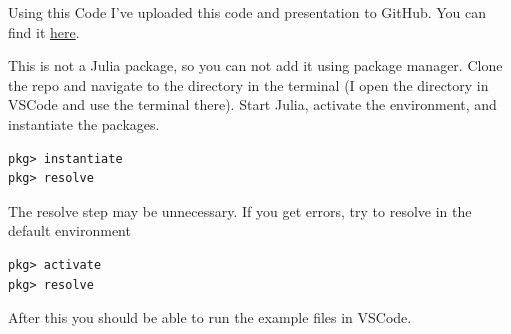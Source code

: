 \documentclass{beamer}
\begin{document}
\begin{frame}[fragile]{Using this Code}
    I've uploaded this code and presentation to GitHub. You can find it \href{https://github.com/mitchphillipson/2025-04-22-USDA_MPSGE}{here}. 

    \vspace{3mm}

    This is not a Julia package, so you can not add it using package manager. Clone the repo and navigate to the directory in the terminal (I open the directory in VSCode and use the terminal there). Start Julia, activate the environment, and instantiate the packages.


    \begin{verbatim}
pkg> instantiate
pkg> resolve
    \end{verbatim}

    \vspace{-5mm}

    The resolve step may be unnecessary. If you get errors, try to resolve in the default environment

    \begin{verbatim}
pkg> activate
pkg> resolve
    \end{verbatim}

    \vspace{-5mm}
    After this you should be able to run the example files in VSCode.

\end{frame}
\end{document}
